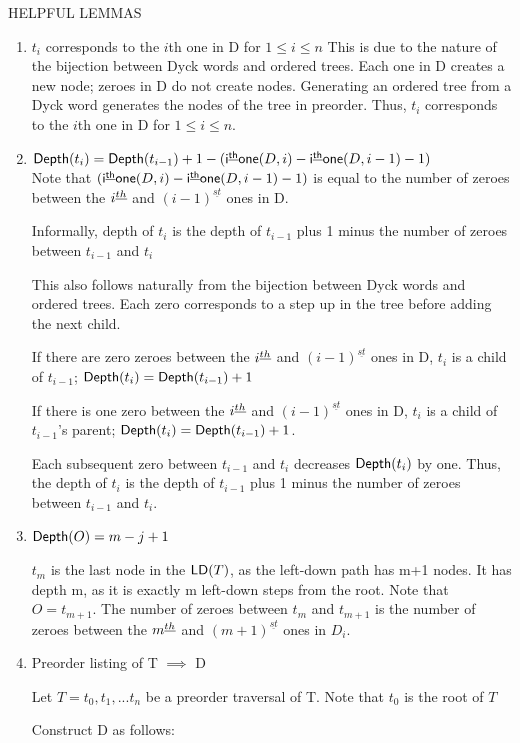 HELPFUL LEMMAS
\begin{enumerate}
    \item $t_i$ corresponds to the $i$th one in D for $1 \le i \le n$
	This is due to the nature of the bijection between Dyck words and ordered trees.  Each one in D creates a new node; zeroes in D do not create nodes.  Generating an ordered tree from a Dyck word generates the nodes of the tree in preorder.  Thus, $t_i$ corresponds to the $i$th one in D for $1 \le i \le n$.
    \item $\mathsf{Depth}{(t_i)}=\mathsf{Depth}{(t_{i-1})}+1-(\mathsf{i^{\underline{th}}one}({D}, i)-\mathsf{i^{\underline{th}}one}({D}, i-1)-1)$ \\
	Note that $(\mathsf{i^{\underline{th}}one}({D}, i)-\mathsf{i^{\underline{th}}one}({D}, i-1)-1)$ is equal to the number of zeroes between the $i^{\underline{th}}$ and $(i-1)^{\underline{st}}$ ones in D.  


	Informally, depth of $t_i$ is the depth of $t_{i-1}$ plus 1 minus the number of zeroes between $t_{i-1}$ and $t_{i}$

	This also follows naturally from the bijection between Dyck words and ordered trees.  Each zero corresponds to a step up in the tree before adding the next child.  

	If there are zero zeroes between the $i^{\underline{th}}$  and $(i-1)^{\underline{st}}$ ones in D, $t_i$ is a child of $t_{i-1}$; $\mathsf{Depth}{(t_i)}=\mathsf{Depth}{(t_{i-1})}+1$

	If there is one zero between the $i^{\underline{th}}$  and $(i-1)^{\underline{st}}$ ones in D, $t_i$ is a child of $t_{i-1}$'s parent; $\mathsf{Depth}{(t_i)}=\mathsf{Depth}{(t_{i-1})}+1$.  

	Each subsequent zero between $t_{i-1}$ and $t_i$ decreases $\mathsf{Depth}{(t_{i})}$ by one.  Thus, the depth of $t_i$ is the depth of $t_{i-1}$ plus 1 minus the number of zeroes between $t_{i-1}$ and $t_{i}$.



    \item $\mathsf{Depth}{(O)}=m-j+1$

	$t_m$ is the last node in the $\mathsf{LD}{(T)}$, as the left-down path has m+1 nodes. It has depth m, as it is exactly m left-down steps from the root.  Note that $O=t_{m+1}$.  The number of zeroes between $t_m$ and $t_{m+1}$ is the number of zeroes between the $m^{\underline{th}}$ and $(m+1)^{\underline{st}}$ ones in $D_i$.  

    \item Preorder listing of T $\implies $ D

	Let $T=t_0,t_1,...t_n$ be a preorder traversal of T.  Note that $t_0$ is the root of $T$

	Construct D as follows: 


\end{enumerate}

